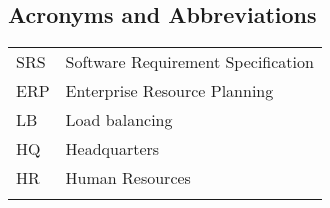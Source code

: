 \begin{center}
\section*{Acronyms and Abbreviations}
\end{center}


\begin{tabular}{p{3cm}p{11cm}}
SRS & Software Requirement Specification \\
ERP & Enterprise Resource Planning \\
LB & Load balancing \\
HQ & Headquarters \\
HR & Human Resources \\
\\
\end{tabular}
